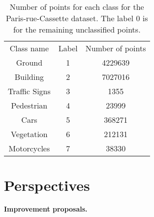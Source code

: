 \documentclass[a4paper, 11pt]{article}
\begin{document}
\begin{table}[H]
    \centering
    \begin{tabular}{|c|c|c|}
        Class name & Label & Number of points \\
        Ground & 1 & 4229639\\ 
        Building & 2 & 7027016 \\ 
        Traffic Signs & 3 & 1355\\ 
        Pedestrian & 4 & 23999\\ 
        Cars & 5 & 368271\\ 
        Vegetation & 6 & 212131\\ 
        Motorcycles & 7 & 38330\\ 
    \end{tabular}
    \caption{Number of points for each class for the Paris-rue-Cassette dataset. The label 0 is for the remaining unclassified points.}
    \label{tab:classes}
\end{table}

\section{Perspectives}

\textbf{Improvement proposals. }

\printbibliography
\end{document}
